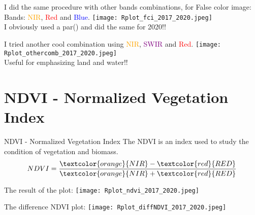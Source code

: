\documentclass{beamer}
\begin{document}
\begin{frame}%
 I did the same procedure with other bands combinations, for False color image:  Bands: \textcolor{orange}{NIR}, \textcolor{red}{Red} and \textcolor{blue}{Blue}.
    \scriptsize{}
    \texttt{[image: Rplot\_fci\_2017\_2020.jpeg]}\\
    I obviously used a par() and did the same for 2020!!
\end{frame}

\begin{frame}%
 I tried another cool combination using \textcolor{orange}{NIR}, \textcolor{purple}{SWIR} and \textcolor{red}{Red}.
    \texttt{[image: Rplot\_othercomb\_2017\_2020.jpeg]}\\
    Useful for emphasizing land and water!!
\end{frame}

\section{NDVI - Normalized Vegetation Index}
\begin{frame}{NDVI - Normalized Vegetation Index}
The NDVI is an index used to study the condition of vegetation and biomass. 
\bigskip
\begin{equation}
    NDVI = \frac{\textcolor{orange}{NIR} - \textcolor{red}{RED}}{\textcolor{orange}{NIR} + \textcolor{red}{RED}}
\end{equation}
  \scriptsize{}
    
\end{frame}

\begin{frame}%
    The result of the plot: 
    \texttt{[image: Rplot\_ndvi\_2017\_2020.jpeg]}\\
\end{frame}

\begin{frame}
The difference NDVI plot:
\scriptsize{}
    \centering
    \texttt{[image: Rplot\_diffNDVI\_2017\_2020.jpeg]}\\
\end{frame}
\end{document}
